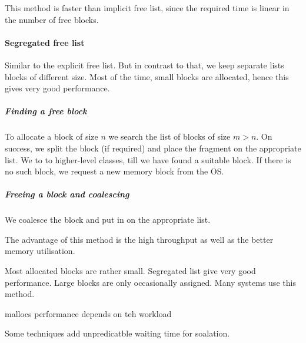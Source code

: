 This method is faster than implicit free list, since the required time is linear in the number of free blocks.

\paragraph{Segregated free list}
Similar to the explicit free list. But in contrast to that, we keep separate lists blocks of different size. Most of the time, small blocks are allocated, hence this gives very good performance.

\subparagraph{Finding a free block}
To allocate a block of size $n$ we search the list of blocks of size $m > n$. On success, we split the block (if required) and place the fragment on the appropriate list. We to to higher-level classes, till we have found a suitable block. If there is no such block, we request a new memory block from the OS. 

\subparagraph{Freeing a block and coalescing}
We coalesce the block and put in on the appropriate list.

The advantage of this method is the high throughput as well as the better memory utilisation.

Most allocated blocks are rather small. Segregated list give very good performance. Large blocks are only occasionally assigned. Many systems use this method.


mallocs performance depends on teh workload


Some techniques add unpredicatble waiting time for soalation.


